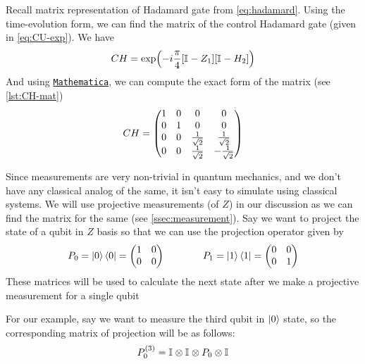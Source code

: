 \documentclass[11pt, oneside, listof=totoc]{scrbook}
\renewcommand{\u}{0}
\renewcommand{\d}{1}
\newcommand{\ku}{\ket{0}}
\newcommand{\kd}{\ket{1}}
\begin{document}
Recall matrix representation of Hadamard gate from \cref{eq:hadamard}. Using the time-evolution form, we can find the matrix of the control Hadamard gate (given in \cref{eq:CU-exp}). We have
\begin{equation*}
    CH = \exp(- i \frac{\pi}{4} [\mathbb{I}_{} - Z_1][\mathbb{I}_{} - H_2])
\end{equation*}
And using \href{https://www.wolfram.com/mathematica/}{\texttt{Mathematica}}, we can compute the exact form of the matrix (see \cref{lst:CH-mat})
\begin{equation}
    CH = \mqty(
    1 & 0 & 0 & 0 \\
    0 & 1 & 0 & 0 \\
    0 & 0 & \frac{1}{\sqrt{2}} & \frac{1}{\sqrt{2}} \\
    0 & 0 & \frac{1}{\sqrt{2}} & - \frac{1}{\sqrt{2}}
    )
\end{equation}

Since measurements are very non-trivial in quantum mechanics, and we don't have any classical analog of the same, it isn't easy to simulate using classical systems. We will use projective measurements (of \(Z\)) in our discussion as we can find the matrix for the same (see \cref{ssec:measurement}). Say we want to project the state of a qubit in \(Z\) basis so that we can use the projection operator given by
\begin{equation*}
    P_{\u} = \ku \bra{\u} = \mqty(1 & 0 \\ 0 & 0) \qquad \qquad P_{\d} = \kd \bra{\d} = \mqty(0 & 0 \\ 0 & 1)
\end{equation*}
These matrices will be used to calculate the next state after we make a projective measurement for a single qubit

For our example, say we want to measure the third qubit in \(\ku\) state, so the corresponding matrix of projection will be as follows:
\begin{equation*}
    P_{\u}^{(3)} = \I{} \otimes \I{} \otimes P_{\u} \otimes \I{}
\end{equation*}

\end{document}
